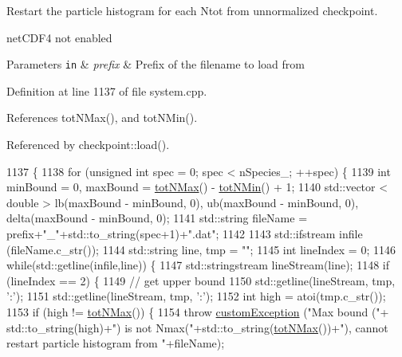 Restart the particle histogram for each Ntot from unnormalized checkpoint. 

net\-C\-D\-F4 not enabled


\begin{DoxyParams}[1]{Parameters}
\mbox{\tt in}  & {\em prefix} & Prefix of the filename to load from \\
\hline
\end{DoxyParams}


Definition at line 1137 of file system.\-cpp.



References tot\-N\-Max(), and tot\-N\-Min().



Referenced by checkpoint\-::load().


\begin{DoxyCode}
1137                                                           \{
1138     \textcolor{keywordflow}{for} (\textcolor{keywordtype}{unsigned} \textcolor{keywordtype}{int} spec = 0; spec < nSpecies\_; ++spec) \{
1139         \textcolor{keywordtype}{int} minBound = 0, maxBound = \hyperlink{classsim_system_aee2c65ecb43a35c0c4d070cdb45f7dc0}{totNMax}() - \hyperlink{classsim_system_af10842e0eaa638373b8717c87b47e6bc}{totNMin}() + 1;
1140         std::vector < double > lb(maxBound - minBound, 0), ub(maxBound - minBound, 0), delta(maxBound - 
      minBound, 0);
1141         std::string fileName = prefix+\textcolor{stringliteral}{"\_"}+std::to\_string(spec+1)+\textcolor{stringliteral}{".dat"};
1142 
1143         std::ifstream infile (fileName.c\_str());
1144         std::string line, tmp = \textcolor{stringliteral}{""};
1145         \textcolor{keywordtype}{int} lineIndex = 0;
1146         \textcolor{keywordflow}{while}(std::getline(infile,line)) \{
1147             std::stringstream lineStream(line);
1148             \textcolor{keywordflow}{if} (lineIndex == 2) \{
1149                 \textcolor{comment}{// get upper bound}
1150                 std::getline(lineStream, tmp, \textcolor{charliteral}{':'});
1151                 std::getline(lineStream, tmp, \textcolor{charliteral}{':'});
1152                 \textcolor{keywordtype}{int} high = atoi(tmp.c\_str());
1153                 \textcolor{keywordflow}{if} (high != \hyperlink{classsim_system_aee2c65ecb43a35c0c4d070cdb45f7dc0}{totNMax}()) \{
1154                     \textcolor{keywordflow}{throw} \hyperlink{classcustom_exception}{customException} (\textcolor{stringliteral}{"Max bound ("}+ std::to\_string(high)+\textcolor{stringliteral}{") is not
       Nmax("}+std::to\_string(\hyperlink{classsim_system_aee2c65ecb43a35c0c4d070cdb45f7dc0}{totNMax}())+\textcolor{stringliteral}{"), cannot restart particle histogram from "}+fileName);

\end{DoxyCode}
